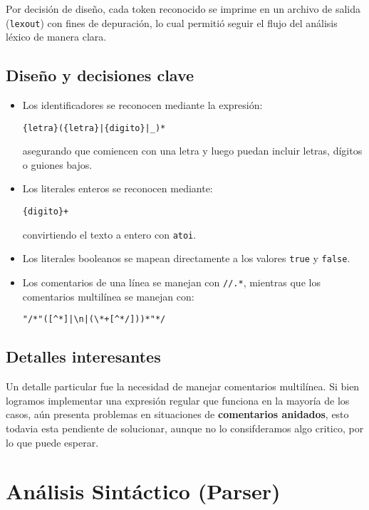 \documentclass[12pt,a4paper]{article}
\begin{document}
Por decisión de diseño, cada token reconocido se imprime en un archivo de salida (\texttt{lexout}) con fines de depuración, 
lo cual permitió seguir el flujo del análisis léxico de manera clara.

\subsection{Diseño y decisiones clave}
\begin{itemize}
    \item Los identificadores se reconocen mediante la expresión:
    \begin{verbatim}
{letra}({letra}|{digito}|_)*
    \end{verbatim}
    asegurando que comiencen con una letra y luego puedan incluir letras, dígitos o guiones bajos.
    
    \item Los literales enteros se reconocen mediante:
    \begin{verbatim}
{digito}+
    \end{verbatim}
    convirtiendo el texto a entero con \texttt{atoi}.
    
    \item Los literales booleanos se mapean directamente a los valores \texttt{true} y \texttt{false}.
    
    \item Los comentarios de una línea se manejan con \texttt{//.*}, mientras que los comentarios multilínea se manejan con:
    \begin{verbatim}
"/*"([^*]|\n|(\*+[^*/]))*"*/
    \end{verbatim}
\end{itemize}

\subsection{Detalles interesantes}
Un detalle particular fue la necesidad de manejar comentarios multilínea. Si bien logramos implementar 
una expresión regular que funciona en la mayoría de los casos, aún presenta problemas en situaciones 
de \textbf{comentarios anidados}, esto todavia esta pendiente de solucionar, aunque no lo consifderamos algo critico, por lo que puede esperar.

\section{Análisis Sintáctico (Parser)}
\end{document}
